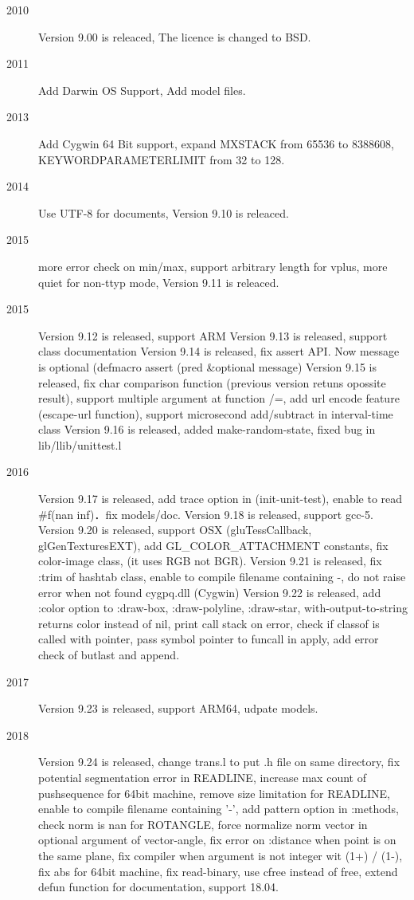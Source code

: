 \begin{description}
\item[2010] Version 9.00 is releaced, The licence is changed to BSD.
\item[2011] Add Darwin OS Support, Add model files.
\item[2013] Add Cygwin 64 Bit support, expand MXSTACK from 65536 to 8388608, KEYWORDPARAMETERLIMIT from 32 to 128.
\item[2014] Use UTF-8 for documents, Version 9.10 is releaced.
\item[2015] more error check on min/max, support arbitrary length for vplus, more quiet for non-ttyp mode, Version 9.11 is releaced.
\item[2015] Version 9.12 is released, support ARM
            Version 9.13 is released, support class documentation
            Version 9.14 is released, fix assert API. Now message is optional (defmacro assert (pred \&optional message)
            Version 9.15 is released, fix char comparison function (previous version retuns opossite result), support multiple argument at function /=,  add url encode feature (escape-url function), support microsecond add/subtract in interval-time class
            Version 9.16 is released, added make-random-state, fixed bug in lib/llib/unittest.l
\item[2016] Version 9.17 is released, add trace option in (init-unit-test), enable to read \#f(nan inf)．fix models/doc.
            Version 9.18 is released, support gcc-5.
            Version 9.20 is released, support OSX (gluTessCallback, glGenTexturesEXT), add GL\_COLOR\_ATTACHMENT constants, fix color-image class, (it uses RGB not BGR).
            Version 9.21 is released, fix :trim of hashtab class, enable to compile filename containing -, do not raise error when not found cygpq.dll (Cygwin)
            Version 9.22 is released, add :color option to :draw-box, :draw-polyline, :draw-star, with-output-to-string returns color instead of nil, print call stack on error, check if classof is called with pointer, pass symbol pointer to funcall in apply, add error check of butlast and append.
\item[2017] Version 9.23 is released, support ARM64, udpate models.
\item[2018] Version 9.24 is released, change trans.l to put .h file on same directory, fix potential segmentation error in READLINE, increase max count of pushsequence for 64bit machine, remove size limitation for READLINE, enable to compile filename containing '-', add pattern option in :methods, check norm is nan for ROTANGLE, force normalize norm vector in optional argument of vector-angle, fix error on :distance when point is on the same plane, fix compiler when argument is not integer wit (1+) / (1-), fix abs for 64bit machine, fix read-binary, use cfree instead of free, extend defun function for documentation, support 18.04.

\end{description}

